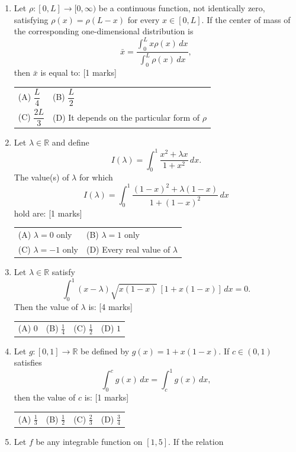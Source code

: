 \documentclass[11pt,a4paper]{article}
\begin{document}
\begin{enumerate}[resume]
{\begin{tabularx}{\linewidth}{X X X X}
\end{tabularx}}
\item Let \(\rho:[0,L]\to[0,\infty)\) be a continuous function, not identically zero, satisfying \(\rho(x)=\rho(L-x)\) for every \(x\in[0,L]\). If the center of mass of the corresponding one-dimensional distribution is \[\bar{x}=\frac{\int_0^L x\rho(x)\,dx}{\int_0^L \rho(x)\,dx},\] then \(\bar{x}\) is equal to: \hfill [1 marks]
{\renewcommand{\arraystretch}{1.8}
\begin{tabularx}{\linewidth}{X X}
(A) \quad \(\dfrac{L}{4}\) & (B) \quad \(\dfrac{L}{2}\) \\[10pt]
(C) \quad \(\dfrac{2L}{3}\) & (D) \quad It depends on the particular form of \(\rho\) \\[10pt]
\end{tabularx}}
\item Let \(\lambda\in\mathbb{R}\) and define
\[
I(\lambda)=\int_{0}^{1}\frac{x^2+\lambda x}{1+x^2}\,dx.
\]
The value(s) of \(\lambda\) for which
\[
I(\lambda)=\int_{0}^{1}\frac{(1-x)^2+\lambda(1-x)}{1+(1-x)^2}\,dx
\]
hold are: \hfill [1 marks]
{\renewcommand{\arraystretch}{1.8}
\begin{tabularx}{\linewidth}{X X}
(A) \quad \(\lambda=0\) only & (B) \quad \(\lambda=1\) only \\[10pt]
(C) \quad \(\lambda=-1\) only & (D) \quad Every real value of \(\lambda\) \\[10pt]
\end{tabularx}}
\item Let \(\lambda\in\mathbb{R}\) satisfy
\[
\int_0^1 (x-\lambda)\sqrt{x(1-x)}\,[1+x(1-x)]\,dx=0.
\]
Then the value of \(\lambda\) is: \hfill [4 marks]
{\renewcommand{\arraystretch}{1.8}
\begin{tabularx}{\linewidth}{X X X X}
(A) \quad \(0\) & (B) \quad \(\frac14\) & (C) \quad \(\frac12\) & (D) \quad \(1\) \\[10pt]
\end{tabularx}}
\item Let $g:[0,1]\to\mathbb{R}$ be defined by $g(x)=1+x(1-x)$. If $c\in(0,1)$ satisfies
\[
\int_0^c g(x)\,dx=\int_c^1 g(x)\,dx,
\]
then the value of $c$ is: \hfill [1 marks]
{\renewcommand{\arraystretch}{1.8}
\begin{tabularx}{\linewidth}{X X X X}
(A) \quad $\frac{1}{3}$ & (B) \quad $\frac{1}{2}$ & (C) \quad $\frac{2}{3}$ & (D) \quad $\frac{3}{4}$ \\[10pt]
\end{tabularx}}
\item Let $f$ be any integrable function on $[1,5]$. If the relation

\end{enumerate}
\end{document}
